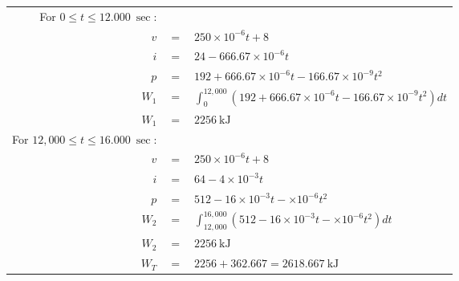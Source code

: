 \documentclass[a4paper]{article}
\begin{document}
\begin{itemize}
\begin{itemize}
\begin{tabular}{r c l}
	      	      	For $0 \leq t \leq \SI{12,000}{\sec}$:      &     &                                                                             \\
	      	      	$v$                                         & $=$ & $250\times10^{-6}t + 8$                                                     \\
	      	      	$i$                                         & $=$ & $24 - 666.67\times10^{-6}t$                                                 \\
	      	      	$p$                                         & $=$ & $192 + 666.67\times10^{-6}t - 166.67\times10^{-9}t^{2}$                     \\
	      	      	$W_{1}$                                     & $=$ & $\int_{0}^{12,000} (192 + 666.67\times10^{-6}t - 166.67\times10^{-9}t^2)dt$ \\
	      	      	$W_{1}$                                     & $=$ & $\SI{2256}{\kilo\joule}$                                                    \\
	      	      	For $12,000 \leq t \leq \SI{16,000}{\sec}$: &     &                                                                             \\
	      	      	$v$                                         & $=$ & $250\times10^{-6}t + 8$                                                     \\
	      	      	$i$                                         & $=$ & $64 - 4\times10^{-3}t$                                                      \\
	      	      	$p$                                         & $=$ & $512 - 16\times10^{-3}t - \times10^{-6}t^{2}$                               \\
	      	      	$W_{2}$                                     & $=$ & $\int_{12,000}^{16,000} (512 - 16\times10^{-3}t - \times10^{-6}t^{2})dt$    \\
	      	      	$W_{2}$                                     & $=$ & $\SI{2256}{\kilo\joule}$                                                    \\
	      	      	$W_{T}$                                     & $=$ & $2256 + 362.667 = \SI{2618.667}{\kilo\joule}$                               \\
	      	      \end{tabular} 
	      \end{itemize}
	      	      	      	      	      	      	      	      	      	      	      	      	      	      	      	      	      	      	      	      	      	      	      	      	      	      	      	      

\end{itemize}
\end{document}
